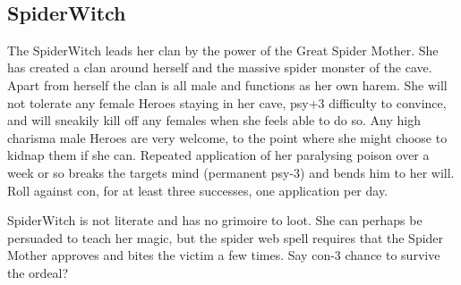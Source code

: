 \

\goodbreak 
\subsection*{SpiderWitch}
\label{spiderwitch}

The SpiderWitch leads her clan by the power of the Great Spider Mother. She has created a clan around herself and the massive spider monster of the cave. Apart from herself the clan is all male and functions as her own harem. She will not tolerate any female Heroes staying in her cave, psy+3 difficulty to convince, and will sneakily kill off any females when she feels able to do so. Any high charisma male Heroes are very welcome, to the point where she might choose to kidnap them if she can. Repeated application of her paralysing poison over a week or so breaks the targets mind (permanent psy-3) and bends him to her will. Roll against con, for at least three successes, one application per day.

SpiderWitch is not literate and has no grimoire to loot. She can perhaps be persuaded to teach her magic, but the spider web spell requires that the Spider Mother approves and bites the victim a few times. Say con-3 chance to survive the ordeal?

\

